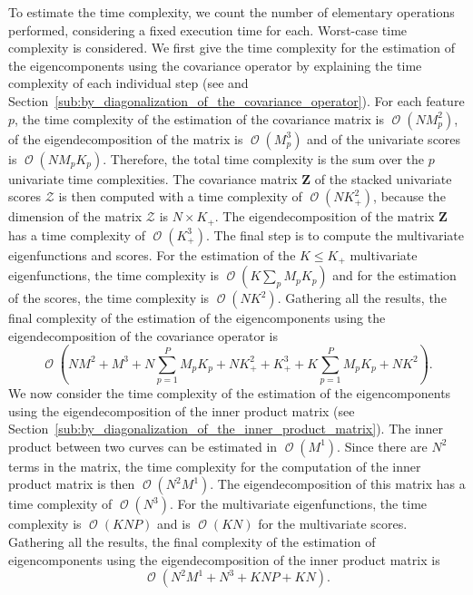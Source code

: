 \documentclass[times,sort&compress,3p]{elsarticle}
\theoremstyle{plain}%
\theoremstyle{definition}
\DeclareMathOperator{\bigO}{\mathcal{O}}
\begin{document}
To estimate the time complexity, we count the number of elementary operations performed, considering a fixed execution time for each. Worst-case time complexity is considered. We first give the time complexity for the estimation of the eigencomponents using the covariance operator by explaining the time complexity of each individual step (see \cite{happMultivariateFunctionalPrincipal2018a} and Section~\ref{sub:by_diagonalization_of_the_covariance_operator}). For each feature $p$, the time complexity of the estimation of the covariance matrix is $\bigO(NM_p^2)$, of the eigendecomposition of the matrix is $\bigO(M_p^3)$ and of the univariate scores is $\bigO(NM_pK_p)$. Therefore, the total time complexity is the sum over the $p$ univariate time complexities. The covariance matrix $\mathbf{Z}$ of the stacked univariate scores $\mathcal{Z}$ is then computed with a time complexity of $\bigO(NK_+^2)$, because the dimension of the matrix $\mathcal{Z}$ is $N \times K_+$. The eigendecomposition of the matrix $\mathbf{Z}$ has a time complexity of $\bigO(K_+^3)$. The final step is to compute the multivariate eigenfunctions and scores. For the estimation of the $K \leq K_+$ multivariate eigenfunctions, the time complexity is $\bigO(K\sum_{p} M_pK_p)$ and for the estimation of the scores, the time complexity is $\bigO(NK^2)$. Gathering all the results, the final complexity of the estimation of the eigencomponents using the eigendecomposition of the covariance operator is
\begin{equation}\label{eq:time_compl_cov}
    \bigO\left(NM^2 + M^3 + N\sum_{p = 1}^P M_pK_p + NK_+^2 + K_+^3 + K\sum_{p = 1}^P M_pK_p + NK^2\right).
\end{equation}
We now consider the time complexity of the estimation of the eigencomponents using the eigendecomposition of the inner product matrix (see Section~\ref{sub:by_diagonalization_of_the_inner_product_matrix}). The inner product between two curves can be estimated in $\bigO(M^1)$. Since there are $N^2$ terms in the matrix, the time complexity for the computation of the inner product matrix is then $\bigO(N^2M^1)$. The eigendecomposition of this matrix has a time complexity of $\bigO(N^3)$. For the multivariate eigenfunctions, the time complexity is $\bigO(KNP)$ and is $\bigO(KN)$ for the multivariate scores. Gathering all the results, the final complexity of the estimation of eigencomponents using the eigendecomposition of the inner product matrix is
\begin{equation}\label{eq:time_compl_in_prod}
    \bigO\left(N^2M^1 + N^3 + KNP + KN\right).
\end{equation}
\end{document}

